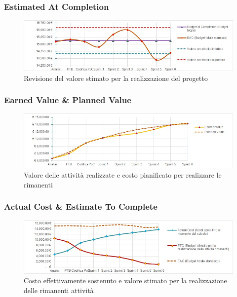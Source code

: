 \subsubsection{Estimated At Completion}
\begin{figure}[H]
  \centering
  \includegraphics[scale=0.8]{immagini/eac.jpg}
  \caption{Revisione del valore stimato per la realizzazione del progetto}
\end{figure}

\subsubsection{Earned Value \& Planned Value}
\begin{figure}[H]
  \centering
  \includegraphics[scale=0.8]{immagini/ev_pv.jpg}
  \caption{Valore delle attività realizzate e costo pianificato per realizzare le rimanenti}
\end{figure}

\subsubsection{Actual Cost \& Estimate To Complete}
\begin{figure}[H]
  \centering
  \includegraphics[scale=0.8]{immagini/ac_etc.jpg}
  \caption{Costo effettivamente sostenuto e valore stimato per la realizzazione delle rimanenti attività}
\end{figure}

